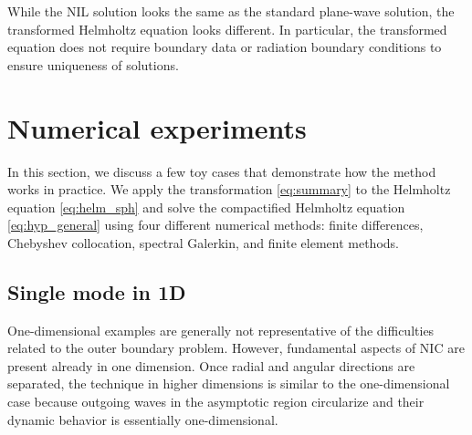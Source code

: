 \documentclass[onefignum,onetabnum]{siamart190516}
\begin{document}
While the NIL solution looks the same as the standard plane-wave solution, the transformed Helmholtz equation looks different. In particular, the transformed equation does not require boundary data or radiation boundary conditions to ensure uniqueness of solutions. 


\section{Numerical experiments}\label{sec:numerical}
In this section, we discuss a few toy cases that demonstrate how the method works in practice. We apply the transformation \eqref{eq:summary} to the Helmholtz equation \eqref{eq:helm_sph} and solve the compactified Helmholtz equation \eqref{eq:hyp_general} using four different numerical methods: finite differences, Chebyshev collocation, spectral Galerkin, and finite element methods.

\subsection{Single mode in 1D}\label{sec:oned}
One-dimensional examples are generally not representative of the difficulties related to the outer boundary problem. However, fundamental aspects of NIC are present already in one dimension. Once radial and angular directions are separated, the technique in higher dimensions is similar to the one-dimensional case because outgoing waves in the asymptotic region circularize and their dynamic behavior is essentially one-dimensional.
\end{document}

